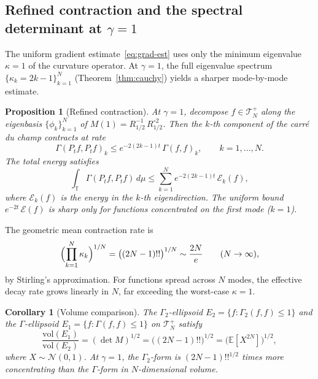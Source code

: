 \documentclass[11pt,a4paper]{article}
\theoremstyle{plain}
\newtheorem{proposition}[theorem]{Proposition}
\newtheorem{corollary}[theorem]{Corollary}
\theoremstyle{definition}
\theoremstyle{remark}
\newcommand{\E}{\mathbb{E}}
\newcommand{\T}{\mathbb{T}}
\begin{document}
\subsection{Refined contraction and the spectral determinant at $\gamma = 1$}

The uniform gradient estimate~\eqref{eq:grad-est} uses only
the minimum eigenvalue $\kappa = 1$ of the curvature operator.
At $\gamma = 1$, the full eigenvalue spectrum
$\{\kappa_k = 2k-1\}_{k=1}^N$ (Theorem~\ref{thm:cauchy})
yields a sharper mode-by-mode estimate.

\begin{proposition}[Refined contraction]\label{prop:refined}
At $\gamma = 1$, decompose $f \in \mathcal{T}_N^+$ along the
eigenbasis $\{\phi_k\}_{k=1}^N$ of $M(1) = R_{1/2}^{-1}\,R_{1/2}^{\circ 2}$.
Then the $k$-th component of the carr\'e du champ contracts at rate
\begin{equation}\label{eq:refined-contraction}
  \Gamma(P_t f, P_t f)_k \leq e^{-2(2k-1)t}\,\Gamma(f,f)_k,
  \qquad k = 1,\ldots,N.
\end{equation}
The total energy satisfies
\begin{equation}\label{eq:total-energy}
  \int_\T \Gamma(P_t f, P_t f)\,d\mu
  \leq \sum_{k=1}^N e^{-2(2k-1)t}\,\mathcal{E}_k(f),
\end{equation}
where $\mathcal{E}_k(f)$ is the energy in the $k$-th eigendirection.
The uniform bound $e^{-2t}\,\mathcal{E}(f)$ is sharp only for
functions concentrated on the first mode ($k=1$).
\end{proposition}

The geometric mean contraction rate is
\[
  \Bigl(\prod_{k=1}^N \kappa_k\Bigr)^{1/N}
  = \bigl((2N-1)!!\bigr)^{1/N} \sim \frac{2N}{e}
  \qquad (N \to \infty),
\]
by Stirling's approximation.
For functions spread across $N$ modes, the effective decay rate
grows linearly in $N$, far exceeding the worst-case $\kappa = 1$.

\begin{corollary}[Volume comparison]\label{cor:volume}
The $\Gamma_2$-ellipsoid
$E_2 = \{f : \Gamma_2(f,f) \leq 1\}$ and the $\Gamma$-ellipsoid
$E_1 = \{f : \Gamma(f,f) \leq 1\}$ on $\mathcal{T}_N^+$ satisfy
\begin{equation}\label{eq:volume-ratio}
  \frac{\mathrm{vol}(E_1)}{\mathrm{vol}(E_2)}
  = (\det M)^{1/2} = \bigl((2N-1)!!\bigr)^{1/2}
  = \bigl(\E[X^{2N}]\bigr)^{1/2},
\end{equation}
where $X \sim \mathcal{N}(0,1)$.
At $\gamma = 1$, the $\Gamma_2$-form is $(2N-1)!!^{1/2}$ times
more concentrating than the $\Gamma$-form in $N$-dimensional volume.
\end{corollary}
\end{document}
